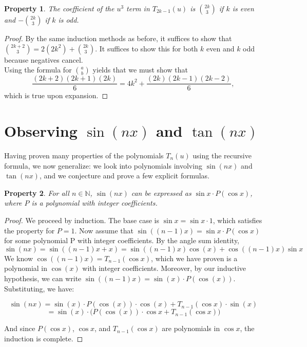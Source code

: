 \documentclass[12pt, letterpaper]{article} %
\newtheorem{theorem}{Property}
\begin{document}
\begin{theorem}
The coefficient of the $u^3$ term in $T_{2k-1}(u)$ is $\binom{2k}{3}$ if $k$ is even and $-\binom{2k}{3}$ if $k$ is odd.
\end{theorem}

\begin{proof}
By the same induction methods as before, it suffices to show that $\binom{2k+2}{3} = 2(2k^2) + \binom{2k}{3}$. It suffices to show this for both $k$ even and $k$ odd because negatives cancel.\\

Using the formula for $\binom{a}{b}$ yields that we must show that
$$\dfrac{(2k+2)(2k+1)(2k)}{6} = 4k^2 + \dfrac{(2k)(2k-1)(2k-2)}{6},$$
which is true upon expansion.
\end{proof}

\section{Observing $\sin(nx)$ and $\tan(nx)$}
Having proven many properties of the polynomials $T_n(u)$ using the recursive formula, we now generalize: we look into polynomials involving $\sin (nx)$ and $\tan (nx)$, and we conjecture and prove a few explicit formulas. \\

\begin{theorem}
For all $n \in \mathbb{N}$, $\sin{(nx)}$ can be expressed as $\sin x \cdot P(\cos x)$, where $P$ is a polynomial with integer coefficients.
\end{theorem}

\begin{proof}
We proceed by induction. The base case is $\sin x = \sin x \cdot 1$, which satisfies the property for $P = 1$. Now assume that $\sin ((n-1)x) = \sin x \cdot P(\cos x)$ for some polynomial P with integer coefficients. By the angle sum identity,
$$ \sin(nx) = \sin((n-1)x + x) = \sin((n-1)x)\cos(x) + \cos((n-1)x) \sin x$$
We know $\cos((n-1)x) = T_{n-1}(\cos x)$, which we have proven is a polynomial in $\cos(x)$ with integer coefficients. Moreover, by our inductive hypothesis, we can write $\sin((n-1)x) = \sin(x) \cdot P(\cos(x))$. Substituting, we have:

$$ \sin(nx) = \sin(x) \cdot P(\cos(x)) \cdot \cos(x) + T_{n-1}(\cos x) \cdot \sin(x)$$
$$ = \sin(x) \cdot \big( P(\cos(x)) \cdot \cos x + T_{n-1}(\cos x) \big)$$

And since $P(\cos x)$, $\cos x$, and $T_{n-1}(\cos x)$ are polynomials in $\cos x$, the induction is complete.
\end{proof}
\end{document}
